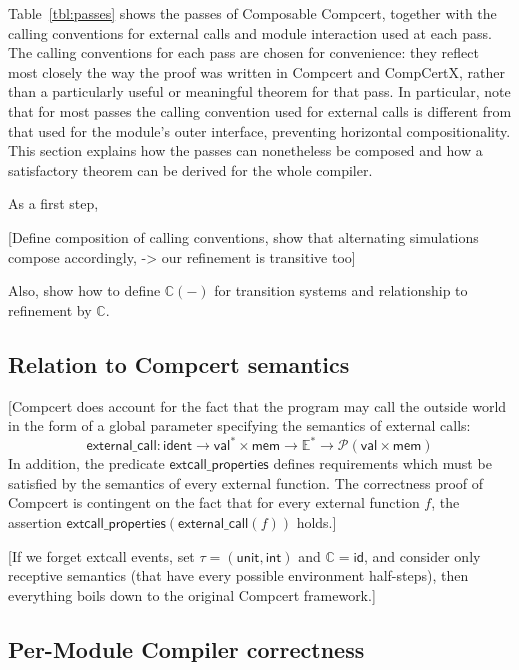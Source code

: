 \documentclass[acmsmall,10pt,review,anonymous]{acmart}
\newcommand{\kw}[1]{\ensuremath{ \textsf{#1} }}
\begin{document}
Table~\ref{tbl:passes} shows the passes of Composable Compcert,
together with the calling conventions for external calls and module interaction
used at each pass.
The calling conventions for each pass are chosen for convenience:
they reflect most closely the way the proof was written
in Compcert and CompCertX,
rather than a particularly useful or meaningful theorem for that pass.
In particular,
note that for most passes
the calling convention used for external calls is different from
that used for the module's outer interface,
preventing horizontal compositionality.
This section explains how the passes can nonetheless be composed
and how a satisfactory theorem can be derived for the whole compiler.



As a first step,




[Define composition of calling conventions,
show that alternating simulations compose accordingly,
-> our refinement is transitive too]

Also, show how to define $\mathbb{C}(-)$
for transition systems
and relationship to refinement by $\mathbb{C}$.


\subsection{Relation to Compcert semantics} %

[Compcert does account for the fact that the program
may call the outside world in the form of a global parameter
specifying the semantics of external calls:
\[
  \kw{external\_call} :
    \kw{ident} \rightarrow
    \kw{val}^* \times \kw{mem} \rightarrow
    \mathbb{E}^* \rightarrow
    \mathcal{P}(\kw{val} \times \kw{mem})
\]
In addition,
the predicate $\kw{extcall\_properties}$ defines
requirements which must be satisfied by the semantics
of every external function.
The correctness proof of Compcert is contingent
on the fact that for every external function $f$,
the assertion $\kw{extcall\_properties}(\kw{external\_call}(f))$ holds.]

[If we forget extcall events,
set $\tau = (\kw{unit}, \kw{int})$ and $\mathbb{C} = \kw{id}$,
and consider only receptive semantics
(that have every possible environment half-steps),
then everything boils down to the original Compcert framework.]


\subsection{Per-Module Compiler correctness} %
\end{document}
